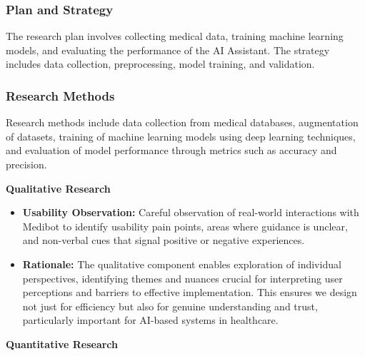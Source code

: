 \subsubsection{Plan and Strategy}
The research plan involves collecting medical data, training machine learning models, and evaluating the performance of the AI Assistant. The strategy includes data collection, preprocessing, model training, and validation.

\subsubsection{Research Methods}
Research methods include data collection from medical databases, augmentation of datasets, training of machine learning models using deep learning techniques, and evaluation of model performance through metrics such as accuracy and precision.

\textbf{Qualitative  Research}

\begin{itemize}
    \item \textbf{Usability Observation: }Careful observation of real-world interactions with Medibot to identify usability pain points, areas where guidance is unclear, and non-verbal cues that signal positive or negative experiences.
    \item \textbf{Rationale:} The qualitative component enables   exploration of individual perspectives, identifying themes and nuances crucial for interpreting user perceptions and barriers to  effective implementation. This ensures we design  not just for efficiency but  also for genuine understanding and trust, particularly important for AI-based systems in healthcare.
    
\end{itemize}


\textbf{Quantitative  Research}

